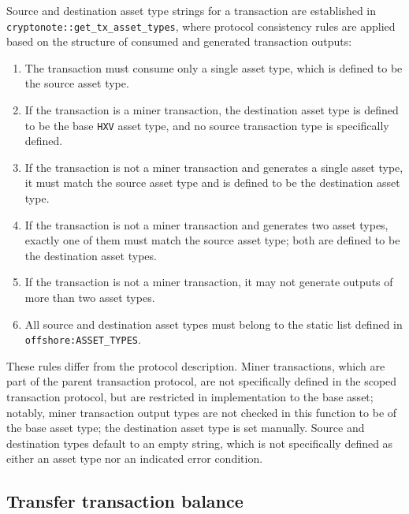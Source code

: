 \documentclass{article}
\begin{document}
Source and destination asset type strings for a transaction are established in \texttt{cryptonote::get\_tx\_asset\_types}, where protocol consistency rules are applied based on the structure of consumed and generated transaction outputs:
\begin{enumerate}
	\item The transaction must consume only a single asset type, which is defined to be the source asset type.
	\item If the transaction is a miner transaction, the destination asset type is defined to be the base \texttt{HXV} asset type, and no source transaction type is specifically defined.
	\item If the transaction is not a miner transaction and generates a single asset type, it must match the source asset type and is defined to be the destination asset type.
	\item If the transaction is not a miner transaction and generates two asset types, exactly one of them must match the source asset type; both are defined to be the destination asset types.
	\item If the transaction is not a miner transaction, it may not generate outputs of more than two asset types.
	\item All source and destination asset types must belong to the static list defined in \texttt{offshore:ASSET\_TYPES}.
\end{enumerate}
These rules differ from the protocol description.
Miner transactions, which are part of the parent transaction protocol, are not specifically defined in the scoped transaction protocol, but are restricted in implementation to the base asset; notably, miner transaction output types are not checked in this function to be of the base asset type; the destination asset type is set manually.
Source and destination types default to an empty string, which is not specifically defined as either an asset type nor an indicated error condition.


\subsection{Transfer transaction balance}
\end{document}
